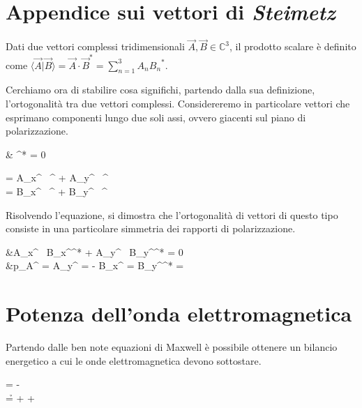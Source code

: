 \section{Appendice sui vettori di \emph{Steimetz}}
	Dati due vettori complessi tridimensionali $\vec{A}, \vec{B} \in \mathbb{C}^3$, il prodotto scalare è definito come $\langle \vec{A} | \vec{B} \rangle = \vec{A} \cdot \vec{B}^* = \sum_{n=1}^3 A_n {B_n}^*$.

	Cerchiamo ora di stabilire cosa significhi, partendo dalla sua definizione,  l'ortogonalità tra due vettori complessi. Considereremo in particolare vettori che esprimano componenti lungo due soli assi, ovvero giacenti sul piano di polarizzazione.

	\begin{esp}
		&  \perp {} \Leftrightarrow {} \cdot {}^* = 0 \quad {}\quad \begin{dcases}
			 = A_{x^{\prime}} \, ^{\prime} + A_{y^{\prime}} \, ^{\prime} \\
			 = B_{x^{\prime}} \, ^{\prime} + B_{y^{\prime}} \, ^{\prime}
		\end{dcases}
	\end{esp}

	Risolvendo l'equazione, si dimostra che l'ortogonalità di vettori di questo tipo consiste in una particolare simmetria dei rapporti di polarizzazione.
	\begin{esp}
		&A_{x^{\prime}} \, B_{x^{\prime}}^* + A_{y^{\prime}} \, B_{y^{\prime}}^* = 0 \\
		&p_A^{\prime} = \jmath {} { A_{y^{\prime}} }
			= - \jmath {} { B_{x^{\prime}} }
			=  {\jmath {} { B_{y^{\prime}}^* }} = \frac{1}{ \left( -p_B^{\prime} \right)^* }
	\end{esp}

\section{Potenza dell'onda elettromagnetica}
	Partendo dalle ben note equazioni di Maxwell è possibile ottenere un bilancio energetico a cui le onde elettromagnetica devono sottostare.

	\begin{esp}
		\begin{dcases}
			\rot \e = - \mu \deriv{\h}{t} \\
			\rot \h = \jt + \sigma \e + \epsilon \deriv{\e}{t} \\
		\end{dcases}
	\end{esp}

